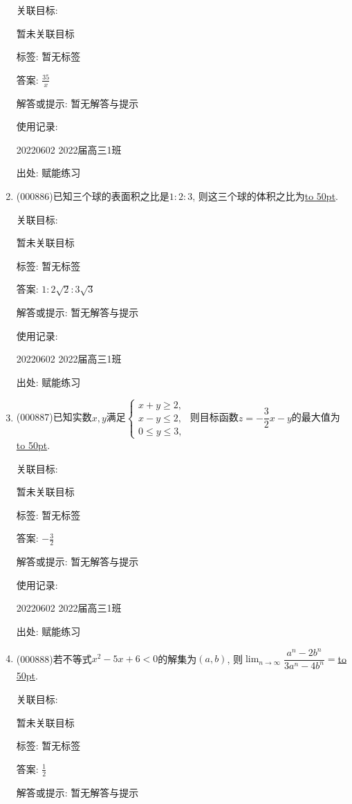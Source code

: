 \documentclass[10pt,a4paper]{article}
\newcommand{\blank}[1]{\underline{\hbox to #1pt{}}}
\begin{document}
\begin{enumerate}[1.]
关联目标:

暂未关联目标



标签: 暂无标签

答案: $\frac{35}x$

解答或提示: 暂无解答与提示

使用记录:

20220602	2022届高三1班	


出处: 赋能练习
\item { (000886)}已知三个球的表面积之比是$1:2:3$, 则这三个球的体积之比为\blank{50}.


关联目标:

暂未关联目标



标签: 暂无标签

答案: $1:2\sqrt 2:3\sqrt 3$

解答或提示: 暂无解答与提示

使用记录:

20220602	2022届高三1班	


出处: 赋能练习
\item { (000887)}已知实数$x,y$满足$\begin{cases}x+y\ge 2, \\ x-y\le 2, \\ 0 \le y\le 3, \end{cases}$ 则目标函数$z=-\dfrac32x-y$的最大值为\blank{50}.


关联目标:

暂未关联目标



标签: 暂无标签

答案: $-\frac 32$

解答或提示: 暂无解答与提示

使用记录:

20220602	2022届高三1班	


出处: 赋能练习
\item { (000888)}若不等式$x^2-5x+6<0$的解集为$(a,b)$, 则$\displaystyle\lim_{n\to\infty}\dfrac{a^n-2b^n}{3a^n-4b^n}=$\blank{50}.


关联目标:

暂未关联目标



标签: 暂无标签

答案: $\frac 12$

解答或提示: 暂无解答与提示


\end{enumerate}
\end{document}
